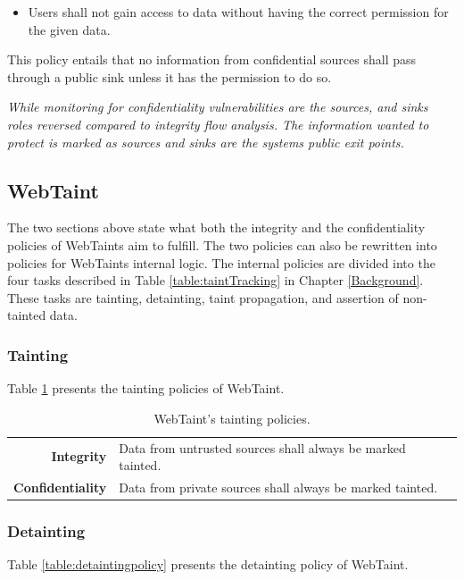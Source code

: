 \hfill
\begin{itemize}
    \item Users shall not gain access to data without having the correct permission for the given data.
\end{itemize}
\hfill

This policy entails that no information from confidential sources shall pass through a public sink unless it has the permission to do so.

\textit{While monitoring for confidentiality vulnerabilities are the sources, and sinks roles reversed compared to integrity flow analysis. The information wanted to protect is marked as sources and sinks are the systems public exit points.}



\subsection{WebTaint}
The two sections above state what both the integrity and the confidentiality policies of WebTaints aim to fulfill. The two policies can also be rewritten into policies for WebTaints internal logic. The internal policies are divided into the four tasks described in Table \ref{table:taintTracking} in Chapter \ref{Background}. These tasks are tainting, detainting, taint propagation, and assertion of non-tainted data.



\subsubsection{Tainting}
Table \ref{table:taintingpolicy} presents the tainting policies of WebTaint.

\begin{table}[H]
    \centering
    \caption{WebTaint's tainting policies.}
    \label{table:taintingpolicy}
    \begin{tabular}{rp{8.5cm}}
        \textbf{Integrity} & Data from untrusted sources shall always be marked tainted. \\
        \textbf{Confidentiality} & Data from private sources shall always be marked tainted. \\         
    \end{tabular}
\end{table}



\subsubsection{Detainting}
Table \ref{table:detaintingpolicy} presents the detainting policy of WebTaint.


